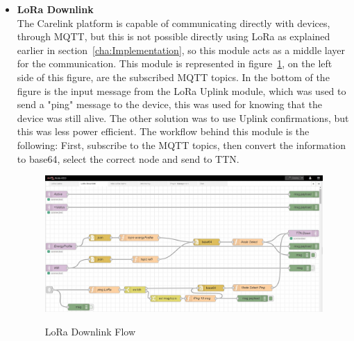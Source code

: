 \begin{itemize}
   \item \textbf{LoRa Downlink} \\
   The Carelink platform is capable of  communicating directly with devices, through MQTT, but this is not possible directly using LoRa as explained earlier in section~\ref{cha:Implementation}, so this module acts as a middle layer for the communication. This module is represented in figure~\ref{fig:LoRa_Downlink}, on the left side of this figure, are the subscribed MQTT topics. In the bottom of the figure is the input message from the LoRa Uplink module, which was used to send a "ping" message to the device, this was used for knowing that the device was still alive. The other solution was to use Uplink confirmations, but this was less power efficient. The workflow behind this module is the following: First, subscribe to the MQTT topics, then convert the information to base64, select the correct node and send to TTN.
   
     \begin{figure}[htbp]
      \centering
      
        {\includegraphics[width=0.9\linewidth]{Chapters/Figures/LoRaDownlink.JPG}}
     
      \caption{LoRa Downlink Flow}
      \label{fig:LoRa_Downlink}
    \end{figure}
\end{itemize}


